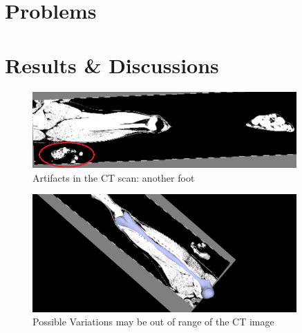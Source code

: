 \documentclass{article}
\begin{document}
	\section{Problems}
	
	\section{Results \& Discussions}
		\begin{figure}
			\centering
			\includegraphics[width=0.9\textwidth]{images/CT_10_foot.png}
			\caption{Artifacts in the CT scan: another foot}
			\label{2.1}
		\end{figure}		
		\begin{figure}
			\centering
			\includegraphics[width=0.9\textwidth]{images/segmentation_10_outofrange.png}
			\caption{Possible Variations may be out of range of the CT image}
			\label{2.2}
		\end{figure}
	
\end{document}
